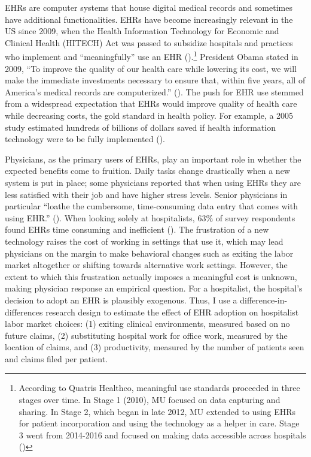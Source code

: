 \documentclass[12pt]{article}
\begin{document}
EHRs are computer systems that house digital medical records and sometimes have additional functionalities. EHRs have become increasingly relevant in the US since 2009, when the Health Information Technology for Economic and Clinical Health (HITECH) Act was passed to subsidize hospitals and practices who implement and ``meaningfully'' use an EHR (\cite{hitech}).\footnote{According to Quatris Healthco, meaningful use standards proceeded in three stages over time. In Stage 1 (2010), MU focused on data capturing and sharing. In Stage 2, which began in late 2012, MU extended to using EHRs for patient incorporation and using the technology as a helper in care. Stage 3 went from 2014-2016 and focused on making data accessible across hospitals (\cite{meanuse})} President Obama stated in 2009, “To improve the quality of our health care while lowering its cost, we will make the immediate investments necessary to ensure that, within five years, all of America’s medical records are computerized.” (\cite{presquote}). The push for EHR use stemmed from a widespread expectation that EHRs would improve quality of health care while decreasing costs, the gold standard in health policy. For example, a 2005 study estimated hundreds of billions of dollars saved if health information technology were to be fully implemented (\cite{hillestad2005}).

Physicians, as the primary users of EHRs, play an important role in whether the expected benefits come to fruition. Daily tasks change drastically when a new system is put in place; some physicians reported that when using EHRs they are less satisfied with their job and have higher stress levels. Senior physicians in particular “loathe the cumbersome, time-consuming data entry that comes with using EHR.” (\cite{CollierBurnout}). When looking solely at hospitalists, 63\% of survey respondents found EHRs time consuming and inefficient (\cite{czernik2022hospitalist}). The frustration of a new technology raises the cost of working in settings that use it, which may lead physicians on the margin to make behavioral changes such as exiting the labor market altogether or shifting towards alternative work settings. However, the extent to which this frustration actually imposes a meaningful cost is unknown, making physician response an empirical question. For a hospitalist, the hospital's decision to adopt an EHR is plausibly exogenous. Thus, I use a difference-in-differences research design to estimate the effect of EHR adoption on hospitalist labor market choices: (1) exiting clinical environments, measured based on no future claims, (2) substituting hospital work for office work, measured by the location of claims, and (3) productivity, measured by the number of patients seen and claims filed per patient.
\end{document}
